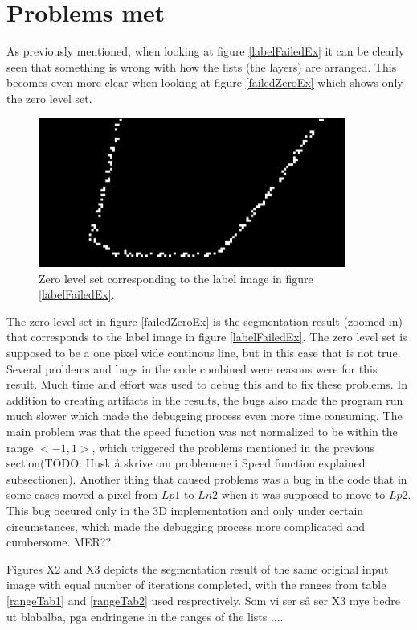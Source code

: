 \section{Problems met}
As previously mentioned, when looking at figure \ref{labelFailedEx} it can be clearly seen that something is wrong with how the lists (the layers) are arranged. This becomes even more clear when looking at figure \ref{failedZeroEx} which shows only the zero level set.
\begin{figure}[h!]
\centering
\includegraphics[width=0.90\textwidth]{implemented/failedZeroEx}
\caption{Zero level set corresponding to the label image in figure \ref{labelFailedEx}.}
\label{labelOkEx}
\end{figure}
The zero level set in figure \ref{failedZeroEx} is the segmentation result (zoomed in) that corresponds to the label image in figure \ref{labelFailedEx}. The zero level set is supposed to be a one pixel wide continous line, but in this case that is not true. Several problems and bugs in the code combined were reasons were for this result. Much time and effort was used to debug this and to fix these problems. In addition to creating artifacts in the results, the bugs also made the program run much slower which made the debugging process even more time consuming. The main problem was that the speed function was not normalized to be within the range $<-1,1>$, which triggered the problems mentioned in the previous section(TODO: Husk å skrive om problemene i Speed function explained subsectionen). Another thing that caused problems was a bug in the code that in some cases moved a pixel from $Lp1$ to $Ln2$ when it was supposed to move to $Lp2$. This bug occured only in the 3D implementation and only under certain circumstances, which made the debugging process more complicated and cumbersome. MER??


Figures X2 and X3 depicts the segmentation result of the same original input image with equal number of iterations completed, with the ranges from table  \ref{rangeTab1} and \ref{rangeTab2} used resprectively. Som vi ser så ser X3 mye bedre ut blabalba, pga endringene in the ranges of the lists
....

